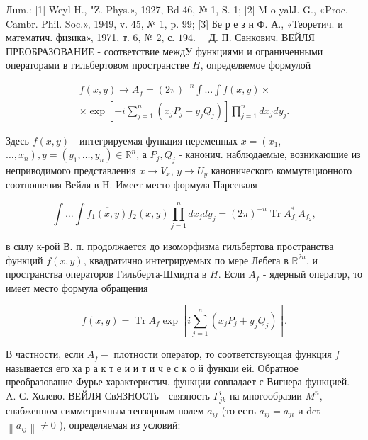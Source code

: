 \documentclass[10pt]{article}
\begin{document}
Лum.: [1] Weyl H., "Z. Phys.», 1927, Bd 46, № 1, S. 1; [2] M o yalJ. G., «Proc. Cambr. Phil. Soc.», 1949, v. 45, № 1, p. 99; [3] Бе р е з н Ф. А., «Теоретич. и математич. физика», 1971, т. 6, № 2, с. $194 . \quad$ Д. П. Санкович. ВЕЙЛЯ ПРЕОБРАЗОВАНИЕ - соответствие междУ функциями и ограниченными операторами в гильбертовом пространстве $H$, определяемое формулой



\[

\begin{gathered}

f(x, y) \rightarrow A_{f}=(2 \pi)^{-n} \int \ldots \int f(x, y) \times \\

\times \exp \left[-i \sum_{j=1}^{n}\left(x_{j} P_{j}+y_{j} Q_{j}\right)\right] \prod_{j=1}^{n} d x_{j} d y_{j} .

\end{gathered}

\]



Здесь $f(x, y)$ - интегрируемая функция переменных $x=\left(x_{1}\right.$, $\left.\ldots, x_{n}\right), y=\left(y_{1}, \ldots, y_{n}\right) \in \mathbb{R}^{n}$, а $P_{j}, Q_{j}$ - канонич. наблюдаемые, возникающие из неприводимого представления $x \rightarrow V_{x}$, $y \rightarrow U_{y}$ канонического коммутационного соотношения Вейля в H. Имеет место формула Парсеваля



\[

\int \ldots \int \overline{f_{1}(x, y)} f_{2}(x, y) \prod_{j=1}^{n} d x_{j} d y_{j}=(2 \pi)^{-n} \operatorname{Tr} A_{f_{1}}^{*} A_{f_{2}},

\]



в силу к-рой В. п. продолжается до изоморфизма гильбертова пространства функций $f(x, y)$, квадратично интегрируемых по мере Лебега в $\mathbb{R}^{2 n}$, и пространства операторов Гильберта-Шмидта в $H$. Если $A_{f}$ - ядерный оператор, то имеет место формула обращения



\[

f(x, y)=\operatorname{Tr} A_{f} \exp \left[i \sum_{j=1}^{n}\left(x_{j} P_{j}+y_{j} Q_{j}\right)\right] .

\]



В частности, если $A_{f}-$ плотности оператор, то соответствующая функция $f$ называется его ха р а к т е и и т и ч е с к о й функци ей. Обратное преобразование Фурье характеристич. функции совпадает с Вигнера функцией. $\quad$ A. С. Холево. ВЕЙЛЯ СвЯЗНОСТь - связность $\Gamma_{j k}^{i}$ на многообразии $M^{n}$, снабженном симметричным тензорным полем $a_{i j}$ (то есть $a_{i j}=a_{j i}$ и det $\left\|a_{i j}\right\| \neq 0$ ), определяемая из условий:
\end{document}
